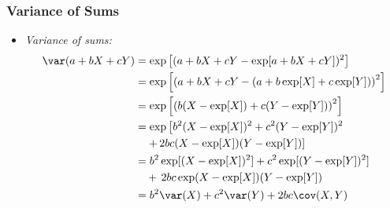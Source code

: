 

\begin{frame}
\frametitle{Variance of Sums}
\begin{itemize}
\item \emph{Variance of sums:}
\begin{align*}
\var(a + bX + cY) 
  & = \exp\left[(a+bX+cY - \exp[a + bX + cY])^2\right]\\
  & = \exp\left[\left(a+bX+cY - (a + b\exp[X] + c\exp[Y])\right)^2 \right]\\
  & = \exp\left[\left(b(X-\exp[X]) + c(Y-\exp[Y])\right)^2\right]\\
  & = \exp\left[b^2 (X-\exp[X])^2 + c^2(Y-\exp[Y])^2\right. \\
      &\left.\quad +\, 2bc(X-\exp[X])(Y-\exp[Y]) \right]\\ 
  & = b^2 \exp[(X-\exp[X])^2] + c^2 \exp[(Y-\exp[Y])^2] \\ 
      &\quad +\, 2bc\exp(X-\exp[X])(Y-\exp[Y])\\
  & = b^2 \var(X) + c^2 \var(Y) + 2bc \cov(X,Y)
\end{align*}
\end{itemize}
\end{frame}
